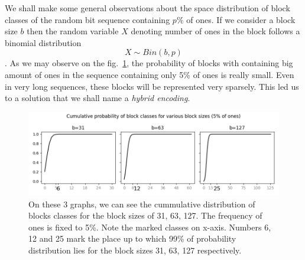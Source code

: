 We shall make some general observations about the space distribution of block
classes of the random bit sequence containing $p\%$ of ones. If we consider a
block size $b$ then the random variable $X$ denoting number of ones in the
block follows a binomial distribution $$X \sim Bin(b,p)$$. As we may observe
on the fig.~\ref{obr:hybridEncodingDistribution}, the probability of blocks
with containing big amount of ones in the sequence containing only 5\% of ones
is really small. Even in very long sequences, these blocks will be represented
very sparsely. This led us to a solution that we shall name a \textit{hybrid encoding}.

\begin{figure}
	\centerline{
		\includegraphics[width=\textwidth]{images/hybrid_encoding_motivation}
	}
	\caption[TODO]{On these 3 graphs, we can see the cummulative distribution
    of blocks classes for the block sizes of 31, 63, 127. The frequency of ones is
    fixed to 5\%. Note the marked classes on x-axis. Numbers 6, 12 and
    25 mark the place up to which 99\% of probability distribution lies for
    the block sizes 31, 63, 127 respectively.
	}
	\label{obr:hybridEncodingDistribution}
\end{figure}

